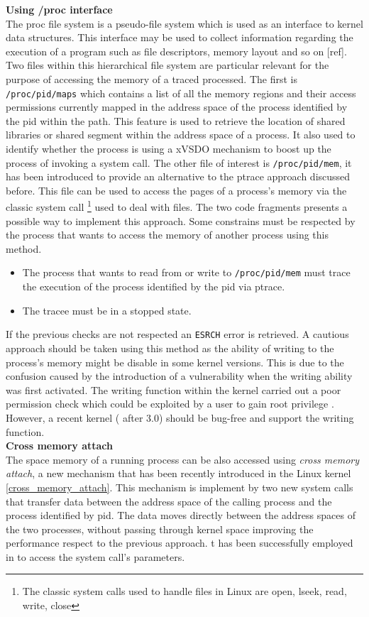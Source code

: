 \textbf{ Using /proc interface} \\
The proc file system is a pseudo-file system which is used as an interface to kernel data structures. This interface may be used to collect information regarding the execution of a program such as file descriptors, memory layout and so on [ref]. Two files within this hierarchical file system are particular relevant for the purpose of accessing the memory of a traced processed. The first is \lstinline$/proc/pid/maps$ which contains a list of all the memory regions and their access permissions currently mapped in the address space of the process identified by the pid within the path. This feature is used to retrieve the location of shared libraries or shared segment within the address space of a process. It also used to identify whether the process is using a xVSDO mechanism to boost up the process of invoking a system call. The other file of interest is \lstinline$/proc/pid/mem$, it has been introduced to provide an alternative to the ptrace approach discussed before. This file can be used to access the pages of a process's memory via the classic system call  \footnote{The classic system calls used to handle files in Linux are open, lseek, read, write, close} used to deal with files. The two code fragments presents a possible way to implement this approach. Some constrains must be respected by the process that wants to access the memory of another process using this method.
\begin{itemize}
\item  The process that wants to read from or write to \lstinline$/proc/pid/mem$ must trace the execution of the process identified by the pid via ptrace.
\item  The tracee must be in a stopped state.  
\end{itemize} 
If the previous checks are not respected an \lstinline$ESRCH$ error is retrieved. A cautious approach should be taken using this method as the ability of writing to the process's memory might be disable in some kernel versions. This is due to the confusion caused by the introduction of a vulnerability when the writing ability was first activated. The writing function within the kernel carried out a poor permission check which could be exploited by a user to gain root privilege \cite{mem_vul}. However, a recent kernel ( after 3.0) should be bug-free and support the writing function. \\
 
\textbf{Cross memory attach}\\
The space memory of a running process can be also accessed using \emph{cross memory attach}, a new mechanism that has been recently introduced in the Linux kernel
 \ref{cross_memory_attach}. This mechanism is implement by two new system calls \cite{cross_memory_attach_syscall} that transfer data between the address space of the calling process and the process identified by pid.  The data moves directly between the address spaces of the two processes, without passing through kernel space improving the performance respect to the previous  approach. t has been successfully employed in \cite{mx:icse13} to access the system call's parameters. 
 
